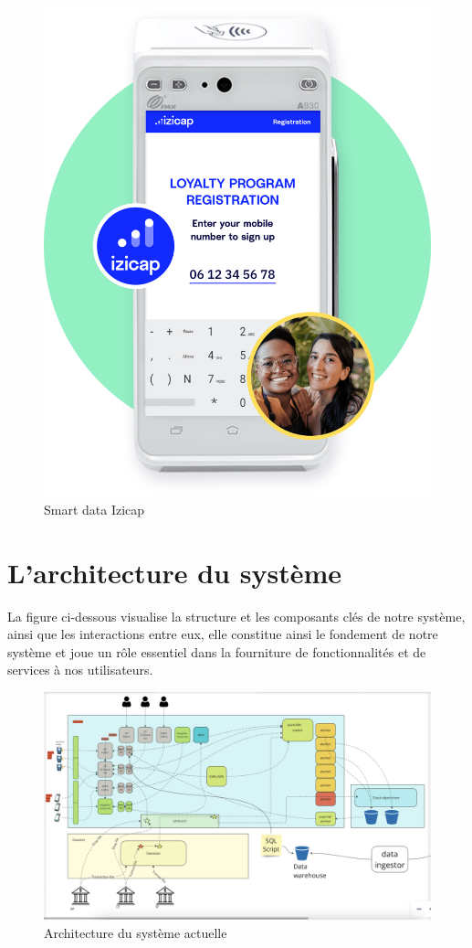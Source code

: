 \begin{figure}[H]
\centering
\includegraphics[width=0.6\linewidth]{images/smart-data-izicap.png}
\caption{Smart data Izicap}\label{fig:smart-data-Izicap}
\end{figure}


\section{L'architecture du système}

La figure ci-dessous visualise la structure et les composants clés de notre système, ainsi que les interactions entre eux, elle constitue ainsi le fondement de notre système et joue un rôle essentiel dans la fourniture de fonctionnalités et de services à nos utilisateurs.

\begin{figure}[H]
\centering
\includegraphics[width=\linewidth]{images/archi-globale.png}
\caption{Architecture du système actuelle}\label{fig:architecture-monolithique}
\end{figure}

